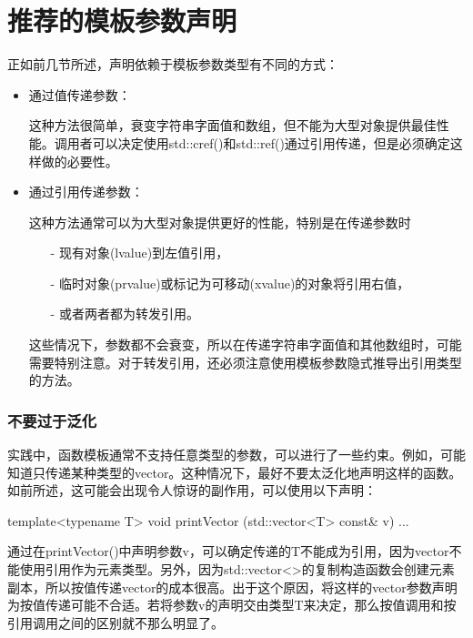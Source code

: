 \section{推荐的模板参数声明}
正如前几节所述，声明依赖于模板参数类型有不同的方式：

\begin{itemize}
\item 
通过值传递参数：

这种方法很简单，衰变字符串字面值和数组，但不能为大型对象提供最佳性能。调用者可以决定使用std::cref()和std::ref()通过引用传递，但是必须确定这样做的必要性。

\item 
通过引用传递参数：

这种方法通常可以为大型对象提供更好的性能，特别是在传递参数时

\begin{itemize}
\item[-]
现有对象(lvalue)到左值引用，

\item[-]
临时对象(prvalue)或标记为可移动(xvalue)的对象将引用右值，

\item[-]
或者两者都为转发引用。
\end{itemize}

这些情况下，参数都不会衰变，所以在传递字符串字面值和其他数组时，可能需要特别注意。对于转发引用，还必须注意使用模板参数隐式推导出引用类型的方法。
\end{itemize}

\subsubsection{不要过于泛化}

实践中，函数模板通常不支持任意类型的参数，可以进行了一些约束。例如，可能知道只传递某种类型的vector。这种情况下，最好不要太泛化地声明这样的函数。如前所述，这可能会出现令人惊讶的副作用，可以使用以下声明：

\begin{cpp}
template<typename T>
void printVector (std::vector<T> const& v) {
	...
}
\end{cpp}

通过在printVector()中声明参数v，可以确定传递的T不能成为引用，因为vector不能使用引用作为元素类型。另外，因为std::vector<>的复制构造函数会创建元素副本，所以按值传递vector的成本很高。出于这个原因，将这样的vector参数声明为按值传递可能不合适。若将参数v的声明交由类型T来决定，那么按值调用和按引用调用之间的区别就不那么明显了。


